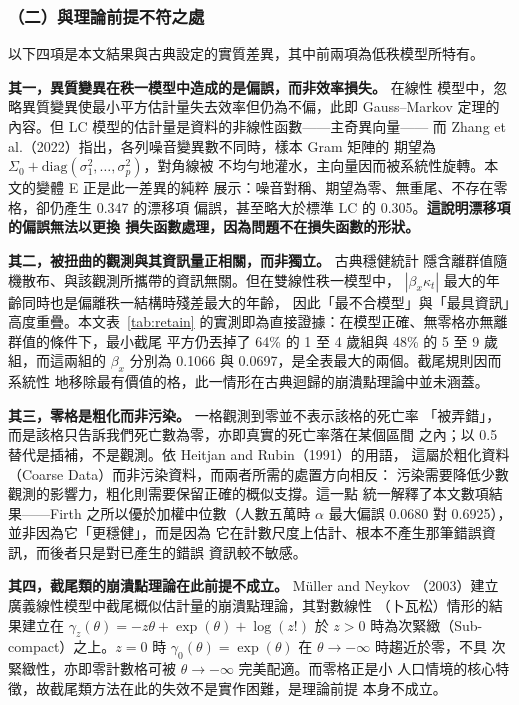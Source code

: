 \documentclass[UTF8, fontset=macnew, a4paper, 12pt]{ctexart}
\begin{document}
\subsubsection{（二）與理論前提不符之處}

以下四項是本文結果與古典設定的實質差異，其中前兩項為低秩模型所特有。

\textbf{其一，異質變異在秩一模型中造成的是偏誤，而非效率損失。} 在線性
模型中，忽略異質變異使最小平方估計量失去效率但仍為不偏，此即 Gauss--Markov
定理的內容。但 LC 模型的估計量是資料的非線性函數——主奇異向量——
而 Zhang et al.（2022）指出，各列噪音變異數不同時，樣本 Gram 矩陣的
期望為 $\Sigma_0+\mathrm{diag}(\sigma_1^2,\dots,\sigma_p^2)$，對角線被
不均勻地灌水，主向量因而被系統性旋轉。本文的變體 E 正是此一差異的純粹
展示：噪音對稱、期望為零、無重尾、不存在零格，卻仍產生 0.347 的漂移項
偏誤，甚至略大於標準 LC 的 0.305。\textbf{這說明漂移項的偏誤無法以更換
損失函數處理，因為問題不在損失函數的形狀。}

\textbf{其二，被扭曲的觀測與其資訊量正相關，而非獨立。} 古典穩健統計
隱含離群值隨機散布、與該觀測所攜帶的資訊無關。但在雙線性秩一模型中，
$|\beta_x\kappa_t|$ 最大的年齡同時也是偏離秩一結構時殘差最大的年齡，
因此「最不合模型」與「最具資訊」高度重疊。本文表~\ref{tab:retain} 的實測即為直接證據：在模型正確、無零格亦無離群值的條件下，最小截尾
平方仍丟掉了 64\% 的 1 至 4 歲組與 48\% 的 5 至 9 歲組，而這兩組的
$\beta_x$ 分別為 0.1066 與 0.0697，是全表最大的兩個。截尾規則因而系統性
地移除最有價值的格，此一情形在古典迴歸的崩潰點理論中並未涵蓋。

\textbf{其三，零格是粗化而非污染。} 一格觀測到零並不表示該格的死亡率
「被弄錯」，而是該格只告訴我們死亡數為零，亦即真實的死亡率落在某個區間
之內；以 0.5 替代是插補，不是觀測。依 Heitjan and Rubin（1991）的用語，
這屬於粗化資料（Coarse Data）而非污染資料，而兩者所需的處置方向相反：
污染需要降低少數觀測的影響力，粗化則需要保留正確的概似支撐。這一點
統一解釋了本文數項結果——Firth 之所以優於加權中位數（人數五萬時
$\alpha$ 最大偏誤 0.0680 對 0.6925），並非因為它「更穩健」，而是因為
它在計數尺度上估計、根本不產生那筆錯誤資訊，而後者只是對已產生的錯誤
資訊較不敏感。

\textbf{其四，截尾類的崩潰點理論在此前提不成立。} Müller and Neykov
（2003）建立廣義線性模型中截尾概似估計量的崩潰點理論，其對數線性
（卜瓦松）情形的結果建立在 $\gamma_z(\theta)=-z\theta+\exp(\theta)
+\log(z!)$ 於 $z>0$ 時為次緊緻（Sub-compact）之上。$z=0$ 時
$\gamma_0(\theta)=\exp(\theta)$ 在 $\theta\to-\infty$ 時趨近於零，不具
次緊緻性，亦即零計數格可被 $\theta\to-\infty$ 完美配適。而零格正是小
人口情境的核心特徵，故截尾類方法在此的失效不是實作困難，是理論前提
本身不成立。
\end{document}
